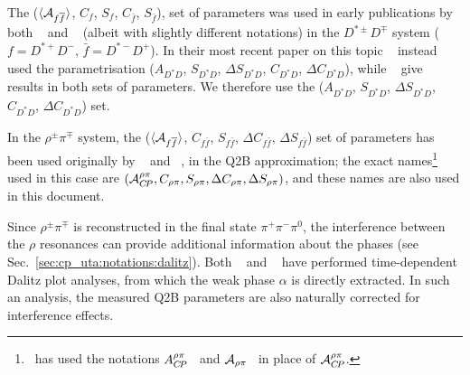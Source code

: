 The ($\Adirnoncp$, $C_f$, $S_f$, $C_{\bar{f}}$, $S_{\bar{f}}$),
set of parameters was used in early publications by both \babar~\cite{Aubert:2007pa} and \belle~\cite{Aushev:2004uc} (albeit with slightly different notations) in the $D^{*\pm}D^{\mp}$ system ($f = D^{*+}D^-$, $\bar{f} = D^{*-}D^+$).
In their most recent paper on this topic \belle~\cite{Rohrken:2012ta} instead used the parametrisation ($A_{D^*D}$, $S_{D^*D}$, $\Delta S_{D^*D}$, $C_{D^*D}$, $\Delta C_{D^*D}$), while \babar~\cite{Aubert:2008ah} give results in both sets of parameters.
We therefore use the ($A_{D^*D}$, $S_{D^*D}$, $\Delta S_{D^*D}$, $C_{D^*D}$, $\Delta C_{D^*D}$) set.

\mysubsubsubsection{$\Bz \to \rho^{\pm}\pi^\mp$
}
\label{sec:cp_uta:notations:non_cp:rhopi}

In the $\rho^\pm\pi^\mp$ system, the 
($\Adirnoncp$, $C_{f\bar{f}}$, $S_{f\bar{f}}$, $\Delta C_{f\bar{f}}$, 
$\Delta S_{f\bar{f}}$)
set of parameters has been used 
originally by \babar~\cite{Aubert:2003wr} and \belle~\cite{Wang:2004va}, 
in the Q2B approximation; 
the exact names\footnote{
  \babar\ has used the notations
  $A_{C\!P}^{\rho\pi}$~\cite{Aubert:2003wr} and 
  ${\cal A}_{\rho\pi}$~\cite{Aubert:2007jn}
  in place of ${\cal A}_{C\!P}^{\rho\pi}$.
}
used in this case are
$\left( 
  {\cal A}_{C\!P}^{\rho\pi}, C_{\rho\pi}, S_{\rho\pi}, \Delta C_{\rho\pi}, \Delta S_{\rho\pi}
\right)$,
and these names are also used in this document.

Since $\rho^\pm\pi^\mp$ is reconstructed in the final state $\pi^+\pi^-\pi^0$,
the interference between the $\rho$ resonances
can provide additional information about the phases 
(see Sec.~\ref{sec:cp_uta:notations:dalitz}).
Both \babar~\cite{Aubert:2007jn} 
and \belle~\cite{Kusaka:2007dv,:2007mj}
have performed time-dependent Dalitz plot analyses, 
from which the weak phase $\alpha$ is directly extracted.
In such an analysis, the measured Q2B parameters are 
also naturally corrected for interference effects.

\label{sec:cp_uta:notations:non_cp:dstarpi}

